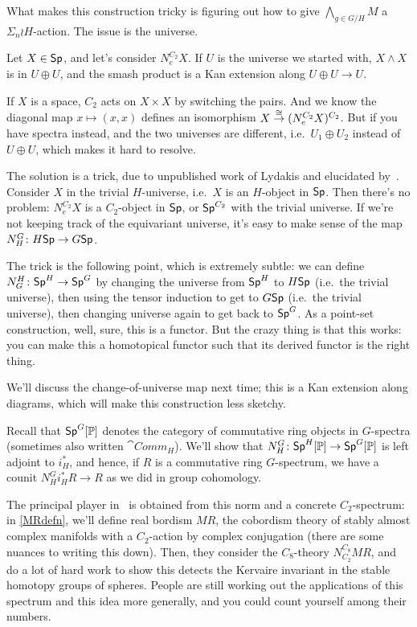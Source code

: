 What makes this construction tricky is figuring out how to give $\bigwedge_{g\in G/H} M$ a $\Sigma_n\wr H$-action.
The issue is the universe.
\begin{exm}
Let $X\in\mathsf{Sp}$, and let's consider $N_e^{C_2}X$. If $U$ is the universe we started with, $X\wedge X$ is in $U\oplus
U$, and the smash product is a Kan extension along $U\oplus U\to U$.

If $X$ is a space, $C_2$ acts on $X\times X$ by switching the pairs. And we know the diagonal map $x\mapsto (x,x)$
defines an isomorphism $X\stackrel\cong\to (N_e^{C_2} X)^{C_2}$. But if you have spectra instead, and the two universes are
different, i.e.\ $U_1\oplus U_2$ instead of $U\oplus U$, which makes it hard to resolve.
\end{exm}
The solution is a trick, due to unpublished work of Lydakis and elucidated by~\cite{HHR}. Consider $X$ in the
trivial $H$-universe, i.e.\ $X$ is an $H$-object in $\mathsf{Sp}$. Then there's no problem: $N_e^{C_2}X$ is a $C_2$-object
in $\mathsf{Sp}$, or $\mathsf{Sp}^{C_2}$ with the trivial universe. If we're not keeping track of the equivariant universe, it's
easy to make sense of the map $N_H^G\colon H\mathsf{Sp}\to G\mathsf{Sp}$.

The trick is the following point, which is extremely subtle: we can define $N_G^H\colon \mathsf{Sp}^H\to\mathsf{Sp}^G$ by
changing the universe from $\mathsf{Sp}^H$ to $H\mathsf{Sp}$ (i.e.\ the trivial universe), then using the tensor induction to get
to $G\mathsf{Sp}$ (i.e.\ the trivial universe), then changing universe again to get back to $\mathsf{Sp}^G$. As a point-set
construction, well, sure, this is a functor. But the crazy thing is that this works: you can make this a homotopical
functor such that its derived functor is the right thing.

We'll discuss the change-of-universe map next time; this is a Kan extension along diagrams, which will make this
construction less sketchy.

Recall that $\mathsf{Sp}^G[\mathbb P]$ denotes the category of commutative ring objects in $G$-spectra (sometimes also written
$\cat{Comm}_H$). We'll show that $N_H^G\colon\mathsf{Sp}^H[\mathbb P]\to\mathsf{Sp}^G[\mathbb P]$ is left adjoint to $i^*_H$, and hence, if $R$
is a commutative ring $G$-spectrum, we have a counit $N_H^Gi_H^*R\to R$ as we did in group cohomology.

The principal player in~\cite{HHR} is obtained from this norm and a concrete $C_2$-spectrum: in \cref{MRdefn},
we'll define real bordism $\mathit{MR}$, the cobordism theory of stably almost complex manifolds with a
$C_2$-action by complex conjugation (there are some nuances to writing this down). Then, they consider the
$C_8$-theory $N_{C_2}^{C_8}\mathit{MR}$, and do a lot of hard work to show this detects the Kervaire invariant in
the stable homotopy groups of spheres. People are still working out the applications of this spectrum and this idea
more generally, and you could count yourself among their numbers.
